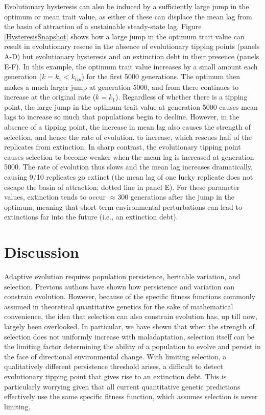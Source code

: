 \documentclass[12pt,letterpaper]{article} %
\begin{document}
Evolutionary hysteresis can also be induced by a sufficiently large jump in the optimum or mean trait value, as either of these can displace the mean lag from the basin of attraction of a sustainable steady-state lag.  
Figure \ref{HysteresisSnapshot} shows how a large jump in the optimum trait value can result in evolutionary rescue in the absence of evolutionary tipping points (panels A-D) but evolutionary hysteresis and an extinction debt in their presence (panels E-F).
In this example, the optimum trait value increases by a small amount each generation ($k=k_1<k_{tip}$) for the first 5000 generations.
The optimum then makes a much larger jump at generation 5000, and from there continues to increase at the original rate ($k=k_1$).   
Regardless of whether there is a tipping point, the large jump in the optimum trait value at generation 5000 causes mean lags to increase so much that populations begin to decline.
However, in the absence of a tipping point, the increase in mean lag also causes the strength of selection, and hence the rate of evolution, to increase, which rescues half of the replicates from extinction.
In sharp contrast, the evolutionary tipping point causes selection to become weaker when the mean lag is increased at generation 5000.
The rate of evolution thus slows and the mean lag increases dramatically, causing 9/10 replicates go extinct (the mean lag of one lucky replicate does not escape the basin of attraction; dotted line in panel E).
For these parameter values, extinction tends to occur $\approx300$ generations after the jump in the optimum, meaning that short term environmental perturbations can lead to extinctions far into the future (i.e., an extinction debt). 
 
\section*{Discussion}

Adaptive evolution requires population persistence, heritable variation, and selection.
Previous authors have shown how persistence \citep[e.g.,][]{Lynch1993,Burger1995} and variation \citep{Gomulkiewicz2009} can constrain evolution.
However, because of the specific fitness functions commonly assumed in theoretical quantitative genetics for the sake of mathematical convenience, the idea that selection can also constrain evolution has, up till now, largely been overlooked. 
In particular, we have shown that when the strength of selection does not uniformly increase with maladaptation, selection itself can be the limiting factor determining the ability of a population to evolve and persist in the face of directional environmental change.
With limiting selection, a qualitatively different persistence threshold arises, a difficult to detect evolutionary tipping point that gives rise to an extinction debt.
This is particularly worrying given that all current quantitative genetic predictions effectively use the same specific fitness function, which assumes selection is never limiting.
\end{document}
